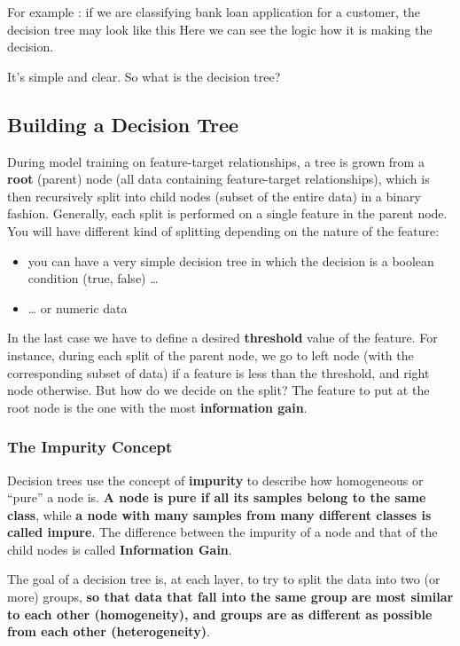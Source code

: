 \documentclass{article}
\providecommand{\tightlist}{%
      \setlength{\itemsep}{0pt}\setlength{\parskip}{0pt}}
\begin{document}
For example : if we are classifying bank loan application for a
customer, the decision tree may look like this Here we can see the logic
how it is making the decision.

    

    It's simple and clear. So what is the decision tree?

    \subsection{Building a Decision Tree}\label{building-a-decision-tree}

During model training on feature-target relationships, a tree is grown
from a \textbf{root} (parent) node (all data containing feature-target
relationships), which is then recursively split into child nodes (subset
of the entire data) in a binary fashion. Generally, each split is
performed on a single feature in the parent node. You will have
different kind of splitting depending on the nature of the feature:

\begin{itemize}
\tightlist
\item
  you can have a very simple decision tree in which the decision is a
  boolean condition (true, false) \ldots{}
\item
  \ldots{} or numeric data
\end{itemize}

In the last case we have to define a desired \textbf{threshold} value of
the feature. For instance, during each split of the parent node, we go
to left node (with the corresponding subset of data) if a feature is
less than the threshold, and right node otherwise. But how do we decide
on the split? The feature to put at the root node is the one with the
most \textbf{information gain}.

    \subsubsection{The Impurity Concept}\label{the-impurity-concept}

Decision trees use the concept of \textbf{impurity} to describe how
homogeneous or ``pure'' a node is. \textbf{A node is pure if all its
samples belong to the same class}, while \textbf{a node with many
samples from many different classes is called impure}. The difference
between the impurity of a node and that of the child nodes is called
\textbf{Information Gain}.

The goal of a decision tree is, at each layer, to try to split the data
into two (or more) groups, \textbf{so that data that fall into the same
group are most similar to each other (homogeneity), and groups are as
different as possible from each other (heterogeneity)}.
\end{document}
